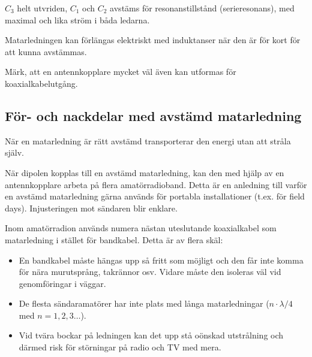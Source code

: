 \(C_3\) helt utvriden, \(C_1\) och \(C_2\) avstäms för
resonanstillstånd (serieresonans), med maximal och lika ström i båda ledarna.

Matarledningen kan förlängas elektriskt med induktanser när den är för
kort för att kunna avstämmas.

Märk, att en antennkopplare mycket väl även kan utformas för
koaxialkabelutgång.

\subsection{För- och nackdelar med avstämd matarledning}

När en matarledning är rätt avstämd transporterar den energi utan att
stråla själv.

När dipolen kopplas till en avstämd matarledning, kan den med hjälp av
en antennkopplare arbeta på flera amatörradioband.
Detta är en anledning till varför en avstämd matarledning gärna används för
portabla installationer (t.ex. för field days).
Injusteringen mot sändaren blir enklare.

Inom amatörradion används numera nästan uteslutande koaxialkabel som
matarledning i stället för bandkabel.
Detta är av flera skäl:

\begin{itemize}
\item En bandkabel måste hängas upp så fritt som möjligt och den får
  inte komma för nära murutsprång, takrännor osv.
  Vidare måste den isoleras väl vid genomföringar i väggar.

\item De flesta sändaramatörer har inte plats med långa matarledningar
  (\(n\cdot\lambda/4\) med \(n = 1, 2, 3 \dots\)).

\item Vid tvära bockar på ledningen kan det upp stå oönskad
  utstrålning och därmed risk för störningar på radio och TV med mera.

\end{itemize}
